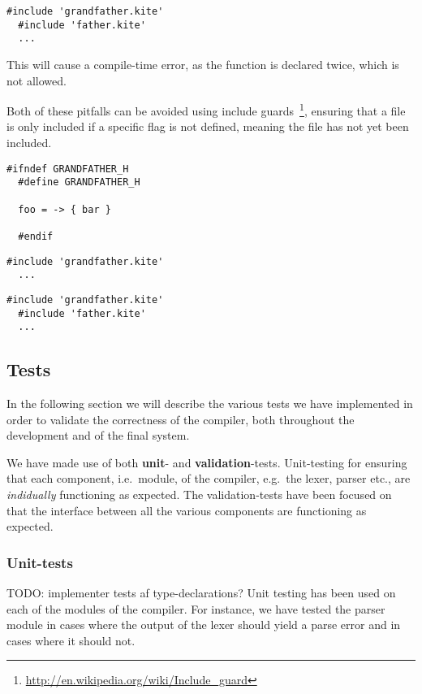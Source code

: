 \begin{lstlisting}[caption=\code{child.kite}]
  #include 'grandfather.kite'
  #include 'father.kite'
  ...
\end{lstlisting}

This will cause a compile-time error, as the  function is declared twice, which is not allowed.

Both of these pitfalls can be avoided using include guards~\footnote{\url{http://en.wikipedia.org/wiki/Include_guard}}, ensuring that a file is only included if a specific flag is not defined, meaning the file has not yet been included.

\begin{lstlisting}[caption=\code{grandfather.kite}]
  #ifndef GRANDFATHER_H
  #define GRANDFATHER_H

  foo = -> { bar }

  #endif
\end{lstlisting}

\begin{lstlisting}[caption=\code{father.kite}]
  #include 'grandfather.kite'
  ...
\end{lstlisting}

\begin{lstlisting}[caption=\code{child.kite}]
  #include 'grandfather.kite'
  #include 'father.kite'
  ...
\end{lstlisting}


\subsection{Tests}
In the following section we will describe the various tests we have implemented in order to validate the correctness of the compiler, both throughout the development and of the final system.

We have made use of both \textbf{unit}- and \textbf{validation}-tests. Unit-testing for ensuring that each component, i.e.\ module, of the compiler, e.g.\ the lexer, parser etc., are \emph{indidually} functioning as expected. The validation-tests have been focused on that the interface between all the various components are functioning as expected.

\subsubsection{Unit-tests}  TODO: implementer tests af type-declarations?
Unit testing has been used on each of the modules of the compiler. For instance, we have tested the parser module in cases where the output of the lexer should yield a parse error and in cases where it should not.

